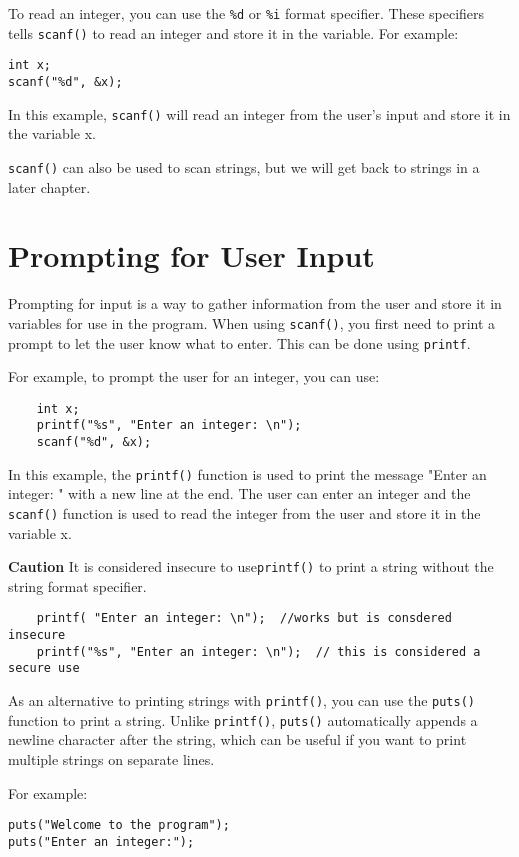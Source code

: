 To read an integer, you can use the  {\tt \%d} or  {\tt \%i}  format specifier. These specifiers tells {\tt scanf()} to read an integer and store it in the variable.  For example:
\begin{verbatim}
int x;
scanf("%d", &x);
\end{verbatim}
In this example, {\tt scanf()} will read an integer from the user's input and store it in the variable x.

{\tt scanf()} can also be used to scan strings, but we will get back to strings in a later chapter.


\section{Prompting for User Input}

Prompting for input is a way to gather information from the user and store it in variables for use in the program. 
When using  {\tt scanf()}, you first need to print a prompt to let the user know what to enter. This can be done using {\tt printf}. 

For example, to prompt the user for an integer, you can use:

\begin{verbatim}
	int x;
	printf("%s", "Enter an integer: \n");
	scanf("%d", &x);
\end{verbatim}
%
In this example, the {\tt printf()} function is used to print the message "Enter an integer: "  
with a new line at the end. The user can enter an integer and the {\tt scanf()}  
function is used to read the integer from the user and store it in the variable x.

{\bf Caution} It is considered insecure to use{\tt printf()} to print a string without the string format specifier.  

\begin{verbatim}
	printf( "Enter an integer: \n");  //works but is consdered insecure
	printf("%s", "Enter an integer: \n");  // this is considered a secure use
\end{verbatim}
%

As an alternative to printing strings with {\tt printf()},  you can use the {\tt puts()} function to print a string. 
Unlike {\tt printf()}, {\tt puts()} automatically appends a newline character after the string, 
which can be useful if you want to print multiple strings on separate lines.

For example:
\begin{verbatim}
puts("Welcome to the program");
puts("Enter an integer:");
\end{verbatim}
%
